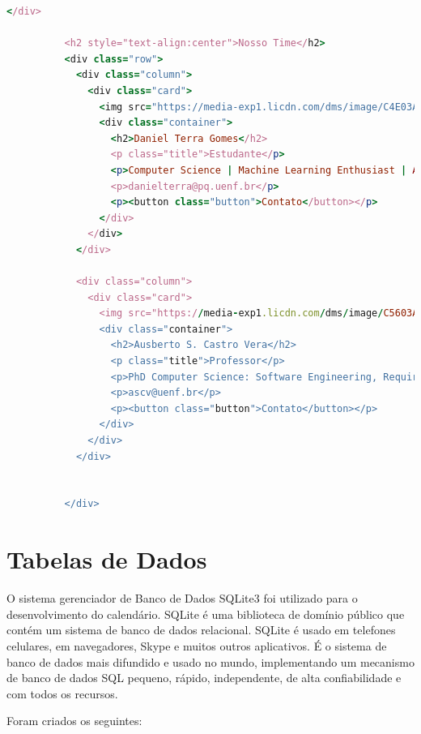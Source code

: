 \begin{itemize}
\begin{lstlisting}[language=Ruby, caption=Tela inicial do sistema (home)]
          </div>

          <h2 style="text-align:center">Nosso Time</h2>
          <div class="row">
            <div class="column">
              <div class="card">
                <img src="https://media-exp1.licdn.com/dms/image/C4E03AQFXwSHsXB5A-w/profile-displayphoto-shrink_200_200/0/1653855378664?e=1671062400&v=beta&t=JnZi5-8DhyHSwJWl68lXvud1KkoxXQDeGJyuVxGWdRY" alt="Daniel" style="width:5%">
                <div class="container">
                  <h2>Daniel Terra Gomes</h2>
                  <p class="title">Estudante</p>
                  <p>Computer Science | Machine Learning Enthusiast | AI Ethics</p>
                  <p>danielterra@pq.uenf.br</p>
                  <p><button class="button">Contato</button></p>
                </div>
              </div>
            </div>

            <div class="column">
              <div class="card">
                <img src="https://media-exp1.licdn.com/dms/image/C5603AQHKXoHRT58ayQ/profile-displayphoto-shrink_200_200/0/1516814846280?e=1671062400&v=beta&t=cic_dbtWwgtjWRRnokSRsCxRugh6w52FOZYAksyRxEs" alt="Ausberto" style="width:5%">
                <div class="container">
                  <h2>Ausberto S. Castro Vera</h2>
                  <p class="title">Professor</p>
                  <p>PhD Computer Science: Software Engineering, Requirements Engineering, Computer Security, Cloud Computing</p>
                  <p>ascv@uenf.br</p>
                  <p><button class="button">Contato</button></p>
                </div>
              </div>
            </div>


          </div>

          \end{lstlisting}
\end{itemize}


\section{Tabelas de Dados}
O sistema gerenciador de Banco de Dados SQLite3 foi utilizado para o desenvolvimento do calendário. SQLite é uma biblioteca de domínio público que contém um sistema de banco de dados relacional. SQLite é usado em telefones celulares, em navegadores, Skype e muitos outros aplicativos. É o sistema de banco de dados mais difundido e usado no mundo, implementando um mecanismo de banco de dados SQL pequeno, rápido, independente, de alta confiabilidade e com todos os recursos.

Foram criados os seguintes:

